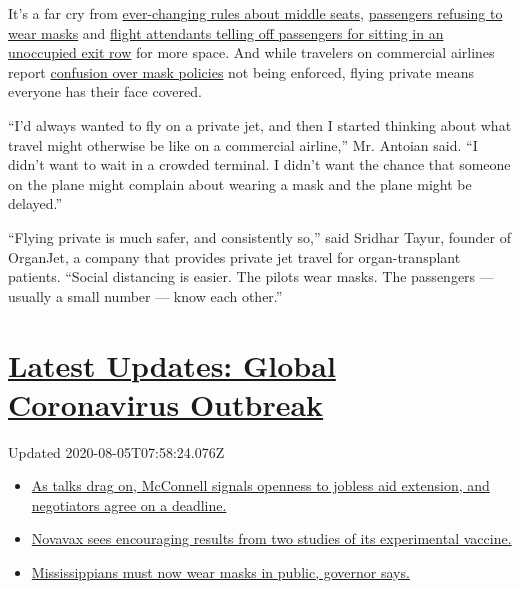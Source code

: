 It's a far cry from
\href{https://www.nytimes3xbfgragh.onion/2020/07/10/world/canada/canada-airlines-coronavirus.html}{ever-changing
rules about middle seats},
\href{https://www.nytimes3xbfgragh.onion/2020/06/18/us/american-airlines-mask-brandon-straka.html}{passengers
refusing to wear masks} and
\href{https://www.nytimes3xbfgragh.onion/2020/07/08/travel/airplanes-social-distancing-coronavirus.html}{flight
attendants telling off passengers for sitting in an unoccupied exit row}
for more space. And while travelers on commercial airlines report
\href{https://www.nytimes3xbfgragh.onion/2020/06/04/travel/coronavirus-flying-face-masks.html}{confusion
over mask policies} not being enforced, flying private means everyone
has their face covered.

``I'd always wanted to fly on a private jet, and then I started thinking
about what travel might otherwise be like on a commercial airline,'' Mr.
Antoian said. ``I didn't want to wait in a crowded terminal. I didn't
want the chance that someone on the plane might complain about wearing a
mask and the plane might be delayed.''

``Flying private is much safer, and consistently so,'' said Sridhar
Tayur, founder of OrganJet, a company that provides private jet travel
for organ-transplant patients. ``Social distancing is easier. The pilots
wear masks. The passengers --- usually a small number --- know each
other.''

\hypertarget{latest-updates-global-coronavirus-outbreak}{%
\section{\texorpdfstring{\href{https://www.nytimes3xbfgragh.onion/2020/08/04/world/coronavirus-cases.html?action=click\&pgtype=Article\&state=default\&region=MAIN_CONTENT_1\&context=storylines_live_updates}{Latest
Updates: Global Coronavirus
Outbreak}}{Latest Updates: Global Coronavirus Outbreak}}\label{latest-updates-global-coronavirus-outbreak}}

Updated 2020-08-05T07:58:24.076Z

\begin{itemize}
\tightlist
\item
  \href{https://www.nytimes3xbfgragh.onion/2020/08/04/world/coronavirus-cases.html?action=click\&pgtype=Article\&state=default\&region=MAIN_CONTENT_1\&context=storylines_live_updates\#link-762df92}{As
  talks drag on, McConnell signals openness to jobless aid extension,
  and negotiators agree on a deadline.}
\item
  \href{https://www.nytimes3xbfgragh.onion/2020/08/04/world/coronavirus-cases.html?action=click\&pgtype=Article\&state=default\&region=MAIN_CONTENT_1\&context=storylines_live_updates\#link-1228a480}{Novavax
  sees encouraging results from two studies of its experimental
  vaccine.}
\item
  \href{https://www.nytimes3xbfgragh.onion/2020/08/04/world/coronavirus-cases.html?action=click\&pgtype=Article\&state=default\&region=MAIN_CONTENT_1\&context=storylines_live_updates\#link-794484ed}{Mississippians
  must now wear masks in public, governor says.}
\end{itemize}

